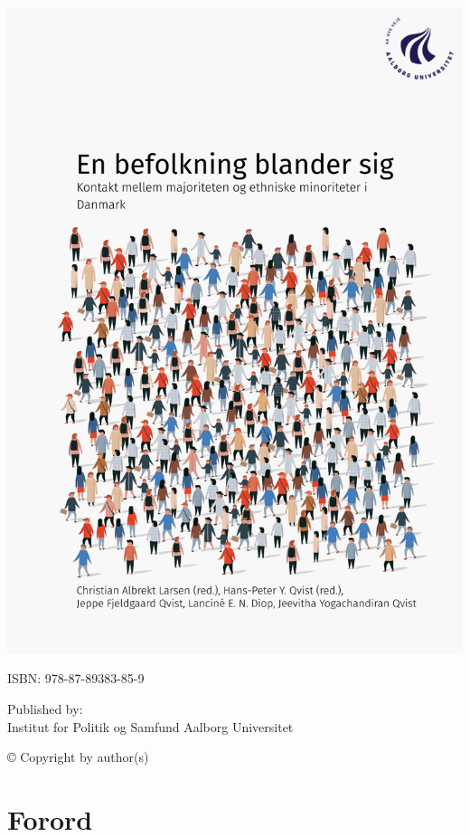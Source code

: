 \documentclass[
]{book}
\subtitle{\emph{Kontakt mellem majoriteten og ethniske minoriteter i Danmark}}
\author{Christian Albrekt Larsen (red.) \and Hans-Peter Y. Qvist (red.) \and Jeppe Fjeldgaard Qvist \and Lanciné Diop-Christensen \and Jeevitha Yogachandiran Qvist}
\date{2025-02-14 14:10:58}
\begin{document}
\thispagestyle{empty} %
\includegraphics[width=\paperwidth,height=\paperheight]{images/00-forside.pdf} %
\restoregeometry %
\clearpage

\pagestyle{empty}

ISBN: 978-87-89383-85-9

Published by:\\
Institut for Politik og Samfund
Aalborg Universitet

© Copyright by author(s)

\newpage
\newpage
\thispagestyle{empty}


\chapter*{Forord}\label{forord}
\end{document}
